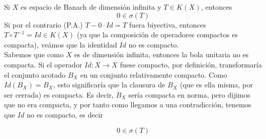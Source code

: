 \begin{ejercicio}
    Si $X$ es espacio de Banach de dimensión infinita y $T \in K(X)$, entonces 
    $$0 \in \sigma(T)$$
    Si por el contrario (P.A.) $T - 0 \cdot Id = T$ fuera biyectiva, entonces $T \circ T^{-1} = Id \in K(X)$ (ya que la composición de operadores compactos es compacta), veámos que la identidad $Id$ no es compacto.\\

    \noindent
    Sabemos que como $X$ es de dimensión infinita, entonces la bola unitaria no es compacta. Si el operador $Id: X \to X$ fuese compacto, por definición, transformaría el conjunto acotado $B_X$ en un conjunto relativamente compacto. Como $Id(B_X) = B_X$, esto significaría que la clausura de $B_X$ (que es ella misma, por ser cerrada) es compacta. Es decir, $B_X$ sería compacta en norma, pero dijimos que no era compacta, y por tanto como llegamos a una contradicción, tenemos que $Id$ no es compacto, es decir

    $$0 \in \sigma(T)$$
\end{ejercicio}


